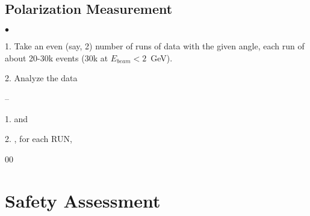 {\subsection {Polarization Measurement }
\label{sec:polmeas}

\begin{list}{$\bullet$}{\setlength{\itemsep}{0.cm}}
  \item[1.] Take an even (say, 2) number  of runs of data with the given angle, each run of about 20-30k
            events (30k at $E_{beam}<2$~GeV).
  \item[2.] Analyze the data
        \begin{list}{--}{\setlength{\itemsep}{0.cm}}
             \item[1.]  and
             \item[2.] , for each RUN,
        \end{list}
\end{list}

} %

\begin{safetyen}{0}{0}
\section {Safety Assessment}
\label{sec:moller_safety}
\end{safetyen}


